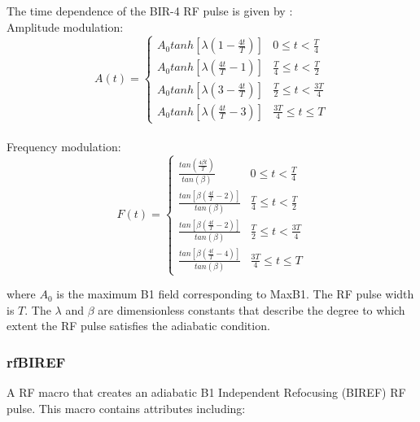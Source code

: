 \documentclass{book}%
\begin{document}
The time dependence of the BIR-4 RF pulse is given by \cite{Handbook2004}: \\
Amplitude modulation:
\begin{equation}
A(t) = 
\begin{cases}
 A_0 tanh[\lambda (1-\frac{4t}{T})]  &  0 \leq t < \frac{T}{4} \\
 A_0 tanh[\lambda (\frac{4t}{T}-1)]  &  \frac{T}{4} \leq t < \frac{T}{2}\\
 A_0 tanh[\lambda (3-\frac{4t}{T})]  &  \frac{T}{2} \leq t < \frac{3T}{4} \\
 A_0 tanh[\lambda (\frac{4t}{T}-3)]  &  \frac{3T}{4} \leq t \leq T
\end{cases}
\label{eq:BIR4A}
\end{equation}
\\
Frequency modulation:
\begin{equation}
F(t) =
\begin{cases}
 \frac{tan(\frac{4\beta t}{T})}{tan(\beta)}  &  0 \leq t < \frac{T}{4} \\
 \frac{tan[\beta (\frac{4t}{T}-2)]}{tan(\beta)}  &  \frac{T}{4} \leq t < \frac{T}{2}\\
 \frac{tan[\beta (\frac{4t}{T}-2)]}{tan(\beta)}   &  \frac{T}{2} \leq t < \frac{3T}{4} \\
 \frac{tan[\beta (\frac{4t}{T}-4)]}{tan(\beta)}   &  \frac{3T}{4} \leq t \leq T
\end{cases}
\label{eq:BIR4F}
\end{equation}

where $A_0$ is the maximum B1 field corresponding to MaxB1. The RF pulse width is $T$. The $\lambda$ and $\beta$ are dimensionless constants that describe the degree to which extent the RF pulse satisfies the adiabatic condition.


\subsubsection{rfBIREF}

A RF macro that creates an adiabatic B1 Independent Refocusing (BIREF) RF pulse. This macro contains attributes including:
\end{document}
